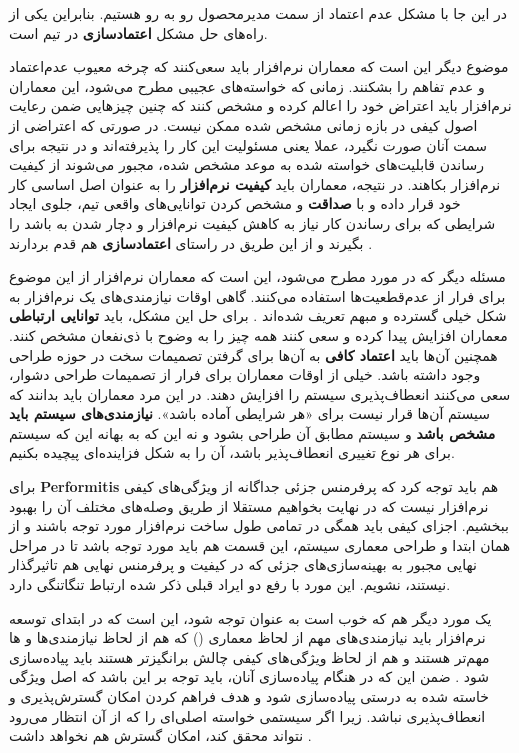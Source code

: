 {\begin{enumerate}[a)]
 در این جا با مشکل عدم اعتماد از سمت مدیرمحصول رو به رو هستیم. بنابراین یکی از راه‌های حل مشکل \textbf{اعتمادسازی} در تیم است. 
 
 موضوع دیگر این است که معماران نرم‌افزار باید سعی‌کنند که چرخه معیوب عدم‌اعتماد و عدم تفاهم را بشکنند. زمانی که خواسته‌های عجیبی مطرح می‌شود، این معماران نرم‌افزار باید اعتراض خود را اعالم کرده و مشخص کنند که چنین چیزهایی ضمن رعایت اصول کیفی در بازه زمانی مشخص شده ممکن نیست. در صورتی که اعتراضی از سمت آنان صورت نگیرد، عملا یعنی مسئولیت این کار را پذیرفته‌اند و در نتیجه برای رساندن قابلیت‌های خواسته شده به موعد مشخص شده، مجبور می‌شوند از کیفیت نرم‌افزار بکاهند.  در نتیجه، معماران باید \textbf{کیفیت نرم‌افزار} را به عنوان اصل اساسی کار خود قرار داده و با \textbf{صداقت} و مشخص کردن توانایی‌های واقعی تیم، جلوی ایجاد شرایطی که برای رساندن کار نیاز به کاهش کیفیت نرم‌افزار و دچار شدن به  باشد را بگیرند و از این طریق در راستای \textbf{اعتمادسازی} هم قدم بردارند \cite{buschmann}.
 
 مسئله دیگر که در مورد  مطرح می‌شود، این است که معماران نرم‌‌افزار از این موضوع برای فرار از عدم‌قطعیت‌ها استفاده می‌کنند. گاهی اوقات نیازمندی‌های یک نرم‌افزار به شکل خیلی گسترده و مبهم تعریف شده‌اند \cite{buschmann2}. برای حل این مشکل،‌ باید \textbf{توانایی ارتباطی} معماران افزایش پیدا کرده و سعی کنند همه چیز را به وضوح با ذی‌نفعان مشخص کنند. همچنین آن‌ها باید \textbf{اعتماد کافی} به آن‌ها برای گرفتن تصمیمات سخت در حوزه طراحی وجود داشته باشد. خیلی از اوقات معماران برای فرار از تصمیمات طراحی دشوار، سعی می‌کنند انعطاف‌پذیری سیستم را افزایش دهند. \cite{Henny} در این مرد معماران باید بدانند که سیستم آن‌ها قرار نیست برای «هر شرایطی آماده باشد». \textbf{نیازمندی‌های سیستم باید مشخص باشد} و سیستم مطابق آن طراحی بشود و نه این که به بهانه این که سیستم برای هر نوع تغییری انعطاف‌پذیر باشد، آن‌ را به شکل فزاینده‌ای پیچیده بکنیم.
 
 برای \textbf{Performitis} هم باید توجه کرد که پرفرمنس جزئی جداگانه از ویژگی‌های کیفی نرم‌افزار نیست که در نهایت بخواهیم مستقلا از طریق وصله‌های مختلف آن را بهبود ببخشیم. اجزای کیفی باید همگی در تمامی طول ساخت نرم‌افزار مورد توجه باشند و از همان ابتدا و طراحی معماری سیستم، این قسمت‌ هم باید مورد توجه باشد تا در مراحل نهایی مجبور به بهینه‌سازی‌های جزئی که در کیفیت و پرفرمنس نهایی هم تاثیرگذار نیستند،‌ نشویم. این مورد با رفع دو ایراد قبلی ذکر شده ارتباط تنگاتنگی دارد. \cite{buschmann}
 
 
 یک مورد دیگر هم که خوب است به عنوان توجه شود، این است که در ابتدای توسعه نرم‌افزار باید نیازمندی‌های مهم از لحاظ معماری () که هم از لحاظ نیازمندی‌ها و  ها مهم‌تر هستند و هم از لحاظ ویژگی‌های کیفی چالش برانگیز‌تر هستند باید پیاده‌سازی شود \cite{Pohl,Weiss}. ضمن این که در هنگام پیاده‌سازی آنان، باید توجه بر این باشد که اصل ویژگی خاسته شده به درستی پیاده‌سازی شود و هدف فراهم کردن امکان گسترش‌پذیری و انعطاف‌پذیری نباشد. زیرا اگر سیستمی خواسته اصلی‌ای را که از آن انتظار می‌رود نتواند محقق کند، امکان گسترش هم نخواهد داشت \cite{Czarnecki}.
 

\end{enumerate}}
